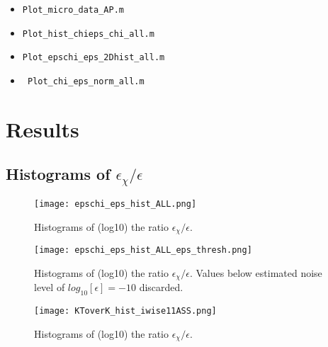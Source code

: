 \documentclass[11pt]{article}
\begin{document}
\begin{itemize}

\item \verb+Plot_micro_data_AP.m+

\item \verb+Plot_hist_chieps_chi_all.m+

\item \verb+Plot_epschi_eps_2Dhist_all.m+

\item \verb+ Plot_chi_eps_norm_all.m+

\end{itemize}


%
%
%
%


\section{Results}



\subsection{Histograms of $\epsilon_{\chi}/\epsilon$}

\begin{figure}[htbp]
\texttt{[image: epschi\_eps\_hist\_ALL.png]}
\caption{Histograms of (log10) the ratio $\epsilon_{\chi}/\epsilon$.}
\label{}
\end{figure}


\begin{figure}[htbp]
\texttt{[image: epschi\_eps\_hist\_ALL\_eps\_thresh.png]}
\caption{Histograms of (log10) the ratio $\epsilon_{\chi}/\epsilon$. Values below estimated noise level of $log_{10}[\epsilon]=-10$ discarded.}
\label{}
\end{figure}


\begin{figure}[htbp]
\texttt{[image: KToverK\_hist\_iwise11ASS.png]}
\caption{Histograms of (log10) the ratio $\epsilon_{\chi}/\epsilon$.}
\label{}
\end{figure}
\end{document}
